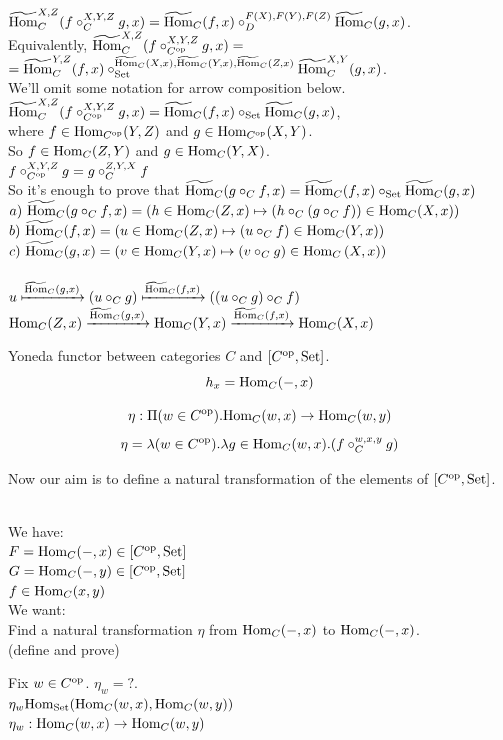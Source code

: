 \documentclass[10pt,a4paper]{article}
\begin{document}
\begin{enumerate}
$\HomMor_C^{X,Z}(f\circ_C^{X,Y,Z} g, x)=\HomMor_C(f,x)\circ_D^{F(X),F(Y),F(Z)} \HomMor_C(g,x)$.\\
Equivalently, $\HomMor_C^{X,Z}(f\circ_{C^\op}^{X,Y,Z} g, x)=$\\ $=\HomMor_C^{Y,Z}(f,x)\circ_\Set^{\HomMor_C(X,x),\HomMor_C(Y,x),\HomMor_C(Z,x)} \HomMor_C^{X,Y}(g,x)$.\\
We'll omit some notation for arrow composition below.\\
$\HomMor_C^{X,Z}(f\circ_{C^\op}^{X,Y,Z} g, x)=\HomMor_C(f,x)\circ_\Set \HomMor_C(g,x)$,\\
where $f\in\Hom_{C^\op}(Y,Z)$ and $g\in\Hom_{C^\op}(X,Y)$.\\
So $f\in\Hom_{C}(Z,Y)$ and $g\in\Hom_{C}(Y,X)$.\\
$f\circ_{C^\op}^{X,Y,Z} g = g\circ_{C}^{Z,Y,X} f$\\
So it's enough to prove that $\HomMor_C(g\circ_C f, x) = \HomMor_C(f, x) \circ_\Set \HomMor_C(g, x)$\\
$a)\ \HomMor_C(g\circ_C f, x) = (h \in\Hom_C(Z,x) \mapsto (h \circ_C (g\circ_C f))\in\Hom_C(X,x))$\\
$b)\ \HomMor_C(f, x) = \left(u \in\Hom_C(Z,x) \mapsto (u \circ_C f)\in\Hom_C(Y,x)\right)$\\
$c)\ \HomMor_C(g, x) = \left(v \in\Hom_C(Y,x) \mapsto (v \circ_C g)\in\Hom_C\left(X,x\right)\right)$\\
\\
$u \xmapsto{\HomMor_C(g, x)} (u \circ_C g) \xmapsto{\HomMor_C(f, x)} ((u \circ_C g) \circ_C f)$
\\
$\Hom_C(Z,x) \xrightarrow{\HomMor_C(g, x)} \Hom_C(Y,x) \xrightarrow{\HomMor_C(f, x)} \Hom_C(X,x)$
\\
\end{enumerate}
\myqed
\begin{definition}
Yoneda functor between categories $C$ and $[C^\op,\Set]$.
$$h_x = \Hom_C(-, x)$$
\end{definition}


\begin{definition}
$$\eta : \Pi(w\in C^\op).\Hom_C(w,x)\to \Hom_C(w,y)$$
$$\eta = \lambda (w\in C^\op). \lambda g\in\Hom_C(w,x).(f\circ_C^{w,x,y} g)$$
\end{definition}
Now our aim is to define a natural transformation of the elements of $[C^\op,\Set]$.\\
\begin{lemma}$\textrm{ }$\\
We have:\\
$F=\Hom_C(-,x)\in [C^\op,\Set]$\\
$G=\Hom_C(-,y)\in [C^\op,\Set]$\\
$f\in\Hom_C(x,y)$\\
We want:\\
Find a natural transformation $\eta$ from $\Hom_C(-,x)$ to $\Hom_C(-,x)$.\\ (define and prove)\\
\end{lemma}
Fix $w\in C^\op$. $\eta_w = ?$.\\
$\eta_w\Hom_\Set(\Hom_C(w,x),\Hom_C(w,y))$\\
$\eta_w: \Hom_C(w,x)\to \Hom_C(w,y)$\\
\end{document}
